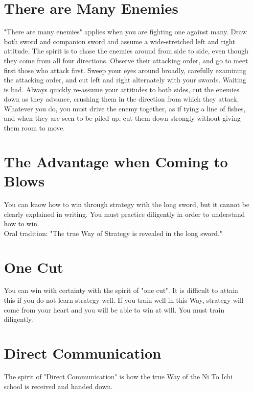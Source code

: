 \section{There are Many Enemies}

"There are many enemies" applies when you are fighting one against many. Draw both sword and companion sword and assume a wide-stretched left and right attitude. The spirit is to chase the enemies around from side to side, even though they come from all four directions. Observe their attacking order, and go to meet first those who attack first. Sweep your eyes around broadly, carefully examining the attacking order, and cut left and right alternately with your swords. Waiting is bad. Always quickly re-assume your attitudes to both sides, cut the enemies down as they advance, crushing them in the direction from which they attack. Whatever you do, you must drive the enemy together, as if tying a line of fishes, and when they are seen to be piled up, cut them down strongly without giving them room to move.\\
\section{The Advantage when Coming to Blows}

You can know how to win through strategy with the long sword, but it cannot be clearly explained in writing. You must practice diligently in order to understand how to win.\\

Oral tradition: "The true Way of Strategy is revealed in the long sword."\\
\section{One Cut}

You can win with certainty with the spirit of "one cut". It is difficult to attain this if you do not learn strategy well. If you train well in this Way, strategy will come from your heart and you will be able to win at will. You must train diligently.\\
\section{Direct Communication}

The spirit of "Direct Communication" is how the true Way of the Ni To Ichi school is received and handed down.\\

